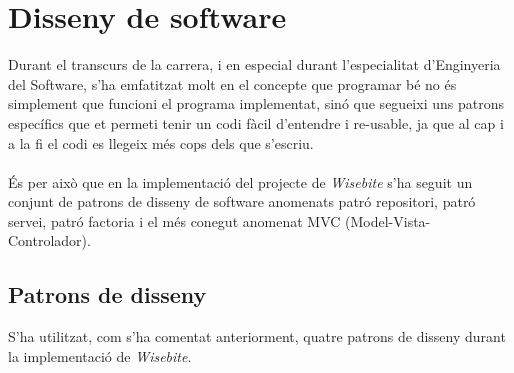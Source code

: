 
\section{Disseny de software}

Durant el transcurs de la carrera, i en especial durant l'especialitat d'Enginyeria del Software, s'ha emfatitzat molt en el concepte que programar bé no és simplement que funcioni el programa implementat, sinó que segueixi uns patrons específics que et permeti tenir un codi fàcil d'entendre i re-usable, ja que al cap i a la fi el codi es llegeix més cops dels que s'escriu.
\\\\
És per això que en la implementació del projecte de \textit{Wisebite} s'ha seguit un conjunt de patrons de disseny de software anomenats patró repositori, patró servei, patró factoria i el més conegut anomenat MVC (Model-Vista-Controlador).

\subsection{Patrons de disseny}

S'ha utilitzat, com s'ha comentat anteriorment, quatre patrons de disseny durant la implementació de \textit{Wisebite}.

